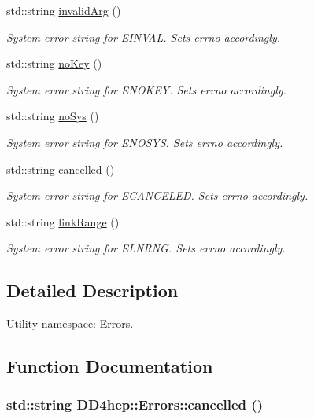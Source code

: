 \begin{DoxyCompactItemize}
std::string \hyperlink{namespace_d_d4hep_1_1_errors_ab559bb58296daa1eed2725c602cb2483}{invalidArg} ()
\begin{DoxyCompactList}\small\item\em System error string for EINVAL. Sets errno accordingly. \item\end{DoxyCompactList}\item 
std::string \hyperlink{namespace_d_d4hep_1_1_errors_ace8817a7446265e17083aa87e73d6019}{noKey} ()
\begin{DoxyCompactList}\small\item\em System error string for ENOKEY. Sets errno accordingly. \item\end{DoxyCompactList}\item 
std::string \hyperlink{namespace_d_d4hep_1_1_errors_a70d74e1cb3eced52822c830c2bf4990b}{noSys} ()
\begin{DoxyCompactList}\small\item\em System error string for ENOSYS. Sets errno accordingly. \item\end{DoxyCompactList}\item 
std::string \hyperlink{namespace_d_d4hep_1_1_errors_a69cd23934005401444f50404ab454f53}{cancelled} ()
\begin{DoxyCompactList}\small\item\em System error string for ECANCELED. Sets errno accordingly. \item\end{DoxyCompactList}\item 
std::string \hyperlink{namespace_d_d4hep_1_1_errors_a6e59237308b289629424651a17eb8163}{linkRange} ()
\begin{DoxyCompactList}\small\item\em System error string for ELNRNG. Sets errno accordingly. \item\end{DoxyCompactList}\end{DoxyCompactItemize}


\subsection{Detailed Description}
Utility namespace: \hyperlink{namespace_d_d4hep_1_1_errors}{Errors}. 

\subsection{Function Documentation}
\hypertarget{namespace_d_d4hep_1_1_errors_a69cd23934005401444f50404ab454f53}{
\subsubsection[{cancelled}]{\setlength{\rightskip}{0pt plus 5cm}std::string DD4hep::Errors::cancelled ()}}
\label{namespace_d_d4hep_1_1_errors_a69cd23934005401444f50404ab454f53}


